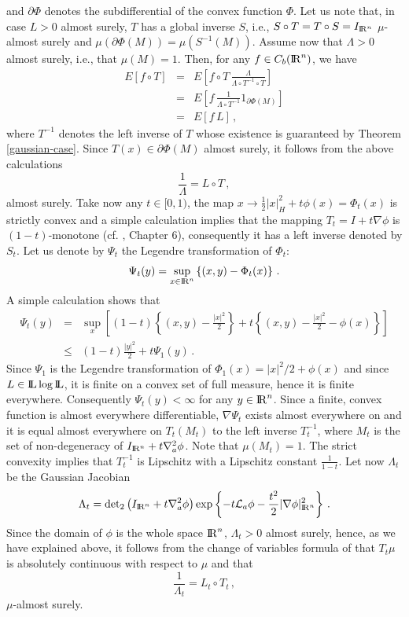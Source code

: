 \documentclass[12pt,a4paper]{book}
\newcommand{\beaa}{\begin{eqnarray*}}
\newcommand{\eeaa}{\end{eqnarray*}}
\newcommand{\La}{\Lambda}
\newcommand{\LL}{{\rm I\!L}}
\newcommand{\calL}{{\cal L}}
\newcommand{\R}{{\rm I\!R}}
\newcommand{\dett}{{\textstyle{\det_2}}}
\begin{document}
and $\partial \Phi$ denotes  the subdifferential of the convex
function  $\Phi$. Let us note that, in case $L>0$ almost surely, $T$
has  a global inverse $S$, i.e., $S\circ T=T\circ S=I_{\R^n}$
$\mu$-almost surely and $\mu(\partial\Phi(M))=\mu(S^{-1}(M))$. 
Assume now that $\La>0$ almost surely, i.e., that $\mu(M)=1$. Then,
for any $f\in C_b(\R^n)$, we have 
\beaa
E[f\circ T]&=&E\left[f\circ T\,\frac{\La}{\La\circ T^{-1}\circ T}\right]\\
&=&E\left[f\,\frac{1}{\La\circ T^{-1}}1_{\partial\Phi(M)}\right]\\
&=&E[f\,L]\,,
\eeaa
where $T^{-1}$ denotes the left inverse of $T$ whose existence is
guaranteed by Theorem \ref{gaussian-case}. Since $T(x)\in
\partial\Phi(M)$ almost surely, it follows from the above calculations
$$
\frac{1}{\La}=L\circ T\,,
$$
almost surely. Take now  any $t\in [0,1)$, the map
$x\to \frac{1}{2}|x|_H^2+t\phi(x)=\Phi_t(x)$ is strictly convex and a simple
calculation implies that the mapping  $T_t=I+t\nabla\phi$ is
$(1-t)$-monotone (cf. \cite{UZ7}, Chapter 6), consequently it has a
left inverse denoted by $S_t$. Let us  denote by $\Psi_t$ the  Legendre
transformation of $\Phi_t$: 
$$
\Psi_t(y)=\sup_{x\in \R^n}\left\{(x,y)-\Phi_t(x)\right\}\,.
$$
A simple calculation shows that 
\beaa
\Psi_t(y)&=&\sup_x\left[(1-t)\left\{(x,y)-\frac{|x|^2}{2}\right\}+
t\left\{(x,y)-\frac{|x|^2}{2}-\phi(x)\right\}\right]\\
&\leq&(1-t)\frac{|y|^2}{2}+t\Psi_1(y)\,.
\eeaa
Since $\Psi_1$ is the Legendre transformation of
$\Phi_1(x)=|x|^2/2+\phi(x)$ and since $L\in \LL\log \LL$, it is
finite on a convex set of full measure, hence it is finite everywhere.
Consequently $\Psi_t(y)<\infty$ for any $y\in \R^n$. Since a finite,
convex function is almost everywhere differentiable, $\nabla \Psi_t$
exists almost everywhere on  and it is equal almost everywhere on
$T_t(M_t)$ to the left inverse $T_t^{-1}$, where $M_t$ is the set of
non-degeneracy of $I_{\R^n}+t\nabla^2_a\phi$. Note that $\mu(M_t)=1$. 
 The strict convexity implies that $T_t^{-1}$ is Lipschitz with a
Lipschitz constant $\frac{1}{1-t}$. 
Let now $\La_t$ be the Gaussian  Jacobian 
$$
\La_t=\dett\left(I_{\R^n}+t\nabla^2_a\phi\right)\exp\left\{-t\calL_a\phi-
\frac{t^2}{2}|\nabla\phi|_{\R^n}^2\right\}\,.
$$
Since the domain of $\phi$ is the whole space $\R^n$, $\La_t>0$ almost
surely, hence, as we have explained above,   it follows from the
change of variables formula of \cite{Mc2} that $T_t\mu$ is absolutely
continuous with respect to $\mu$ and that 
$$
\frac{1}{\La_t}=L_t\circ T_t\,,
$$
$\mu$-almost surely. %
\end{document}
